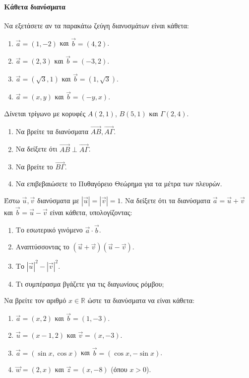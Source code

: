 \documentclass[11pt,a4paper,modern]{FFExercises}
\begin{document}
\paragraph{Κάθετα διανύσματα}

\askhsh 
Να εξετάσετε αν τα παρακάτω ζεύγη διανυσμάτων είναι κάθετα:
\begin{enumerate}
    \item $\vec{a}=(1, -2)$ και $\vec{b}=(4, 2)$.
    \item $\vec{a}=(2, 3)$ και $\vec{b}=(-3, 2)$.
    \item $\vec{a}=(\sqrt{3}, 1)$ και $\vec{b}=(1, \sqrt{3})$.
    \item $\vec{a}=(x, y)$ και $\vec{b}=(-y, x)$.
\end{enumerate}

\askhsh
Δίνεται τρίγωνο με κορυφές $A(2, 1)$, $B(5, 1)$ και $\Gamma(2, 4)$.
\begin{enumerate}
    \item Να βρείτε τα διανύσματα $\vec{AB}, \vec{A\Gamma}$.
    \item Να δείξετε ότι $\vec{AB} \perp \vec{A\Gamma}$.
    \item Να βρείτε το $\vec{B\Gamma}$.
    \item Να επιβεβαιώσετε το Πυθαγόρειο Θεώρημα για τα μέτρα των πλευρών.
\end{enumerate}

\askhsh
Έστω $\vec{u}, \vec{v}$ διανύσματα με $|\vec{u}|=|\vec{v}|=1$. Να δείξετε ότι τα διανύσματα $\vec{a} = \vec{u} + \vec{v}$ και $\vec{b} = \vec{u} - \vec{v}$ είναι κάθετα, υπολογίζοντας:
\begin{enumerate}
    \item Το εσωτερικό γινόμενο $\vec{a}\cdot\vec{b}$.
    \item Αναπτύσσοντας το $(\vec{u}+\vec{v})(\vec{u}-\vec{v})$.
    \item Το $|\vec{u}|^2 - |\vec{v}|^2$.
    \item Τι συμπέρασμα βγάζετε για τις διαγωνίους ρόμβου;
\end{enumerate}

\askhsh
Να βρείτε τον αριθμό $x \in \mathbb{R}$ ώστε τα διανύσματα να είναι κάθετα:
\begin{enumerate}
    \item $\vec{a}=(x, 2)$ και $\vec{b}=(1, -3)$.
    \item $\vec{u}=(x-1, 2)$ και $\vec{v}=(x, -3)$.
    \item $\vec{a}=(\sin x, \cos x)$ και $\vec{b}=(\cos x, -\sin x)$.
    \item $\vec{w}=(2, x)$ και $\vec{z}=(x, -8)$ (όπου $x>0$).
\end{enumerate}
\end{document}
